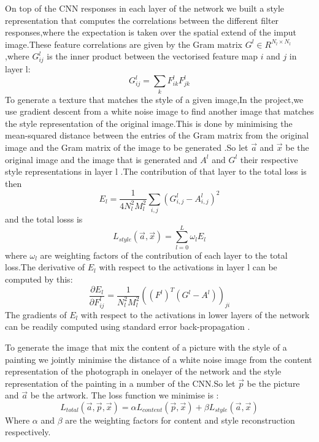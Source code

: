 \documentclass[10pt,a4paper]{ctexart}
\begin{document}
	On top of the CNN responses in each layer of the network we built a style representation that computes the correlations between the different filter responses,where the expectation is taken over the spatial extend of the imput image.These feature correlations are given by the Gram
	matrix $G^l \in R^{N_l\times N_l}$,where $G_{ij}^l$ is the inner product between the vectorised feature map $i$ and $j$ in layer l:
	\begin{equation}
	G_{ij}^{l} = \sum_k F_{ik}^lF_{jk}^l	
	\end{equation}
	To generate a texture that matches the style of a given image,In the project,we use gradient descent from a white noise image to find another image that matches the style representation of the original image.This is
	done by minimising the mean-squared distance between the entries of the Gram matrix from the original image and the Gram matrix of the
	image to be generated .So let $\overrightarrow{a}$ and $\overrightarrow{x}$ be the original image and the image that is generated
	and $A^l$ and $G^l$ their respective style representations in layer l .The
	contribution of that layer to the total loss is then 
	\begin{equation}
	E_l = \dfrac{1}{4N_l^2M_l^2}\sum_{i,j}(G_{i,j}^l - A_{i,j}^l)^2
	\end{equation}
	and the total losss is 
	\begin{equation}
	L_{style}(\overrightarrow{a},\overrightarrow{x})= \sum_{l=0}^{L}\omega_l
	E_l
	\end{equation}
	where $\omega_l$ are weighting factors of the contribution of each layer to the total loss.The derivative of $E_l$ with respect to the activations 
	in layer l can be computed by this:
	\begin{equation}
	\dfrac{\partial E_l}{\partial F_{ij}^l}= \dfrac{1}{N_l^2M_l^2}((F^l)^T(G^l-A^l))_{ji}
	\end{equation}
	The gradients of $E_l$ with respect to the activations in lower layers of the network can be readily computed using standard error back-propagation
	.
	
	To generate the image that mix the content of a picture with the style of a
	painting we jointly minimise the distance of a white noise image from the
	content representation of the photograph in onelayer of the network and the style representation of the painting in a number of the CNN.So let 
	$\overrightarrow{p}$ be the picture and $\overrightarrow{a}$ be the artwork. The loss function we minimise is :
	\begin{equation}
	L_{total}(\overrightarrow{a},\overrightarrow{p},\overrightarrow{x})=\alpha L_{content}(\overrightarrow{p},\overrightarrow{x})+\beta
	L_{style}(\overrightarrow{a},\overrightarrow{x})
	\end{equation}
	Where $\alpha$ and $\beta$ are the weighting factors for content and style reconstruction respectively.
	
	
\end{document}
